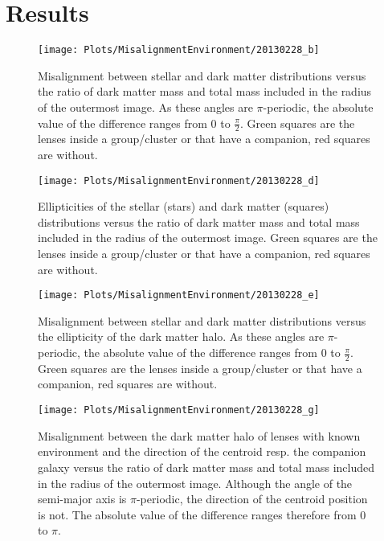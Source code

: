 \documentclass[10pt]{article}
\begin{document}
\section{Results}\label{sec:results}

\begin{figure}[t]
 \begin{minipage}[t]{.48\textwidth}
  \centering
  \texttt{[image: Plots/MisalignmentEnvironment/20130228\_b]}
  \captionsetup{width=\linewidth}
  \caption{Misalignment between stellar and dark matter distributions versus the ratio of dark matter mass and total mass included in the radius of the outermost image. As these angles are $\pi$-periodic, the absolute value of the difference ranges from 0 to $\frac{\pi}{2}$. Green squares are the lenses inside a group/cluster or that have a companion, red squares are without.}
  \label{fig:misalignment}
 \end{minipage}
 \hfill
 \begin{minipage}[t]{.48\textwidth}
  \centering
  \texttt{[image: Plots/MisalignmentEnvironment/20130228\_d]}
  \captionsetup{width=\linewidth}
  \caption{Ellipticities of the stellar (stars) and dark matter (squares) distributions versus the ratio of dark matter mass and total mass included in the radius of the outermost image. Green squares are the lenses inside a group/cluster or that have a companion, red squares are without.}
  \label{fig:ellipticities}
 \end{minipage}
\end{figure}

\begin{figure}[t]
 \begin{minipage}[t]{.48\textwidth}
  \centering
  \texttt{[image: Plots/MisalignmentEnvironment/20130228\_e]}
  \captionsetup{width=\linewidth}
  \caption{Misalignment between stellar and dark matter distributions versus the ellipticity of the dark matter halo. As these angles are $\pi$-periodic, the absolute value of the difference ranges from 0 to $\frac{\pi}{2}$. Green squares are the lenses inside a group/cluster or that have a companion, red squares are without.}
  \label{fig:misalignmentellipticities}
 \end{minipage}
 \hfill
 \begin{minipage}[t]{.48\textwidth}
  \centering
  \texttt{[image: Plots/MisalignmentEnvironment/20130228\_g]}
  \captionsetup{width=\linewidth}
  \caption{Misalignment between the dark matter halo of lenses with known environment and the direction of the centroid resp. the companion galaxy versus the ratio of dark matter mass and total mass included in the radius of the outermost image. Although the angle of the semi-major axis is $\pi$-periodic, the direction of the centroid position is not. The absolute value of the difference ranges therefore from 0 to $\pi$.}
  \label{fig:environment}
 \end{minipage}
\end{figure}
\end{document}
